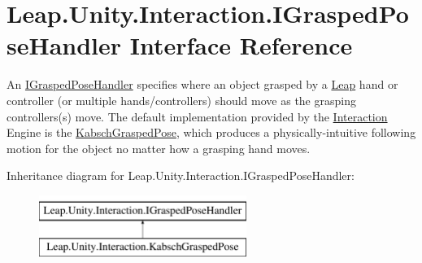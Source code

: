 \hypertarget{interface_leap_1_1_unity_1_1_interaction_1_1_i_grasped_pose_handler}{}\section{Leap.\+Unity.\+Interaction.\+I\+Grasped\+Pose\+Handler Interface Reference}
\label{interface_leap_1_1_unity_1_1_interaction_1_1_i_grasped_pose_handler}


An \mbox{\hyperlink{interface_leap_1_1_unity_1_1_interaction_1_1_i_grasped_pose_handler}{I\+Grasped\+Pose\+Handler}} specifies where an object grasped by a \mbox{\hyperlink{namespace_leap_1_1_unity_1_1_leap}{Leap}} hand or controller (or multiple hands/controllers) should move as the grasping controllers(s) move. The default implementation provided by the \mbox{\hyperlink{namespace_leap_1_1_unity_1_1_interaction}{Interaction}} Engine is the \mbox{\hyperlink{class_leap_1_1_unity_1_1_interaction_1_1_kabsch_grasped_pose}{Kabsch\+Grasped\+Pose}}, which produces a physically-\/intuitive following motion for the object no matter how a grasping hand moves.  


Inheritance diagram for Leap.\+Unity.\+Interaction.\+I\+Grasped\+Pose\+Handler\+:\begin{figure}[H]
\begin{center}
\leavevmode
\includegraphics[height=2.000000cm]{interface_leap_1_1_unity_1_1_interaction_1_1_i_grasped_pose_handler}
\end{center}
\end{figure}
